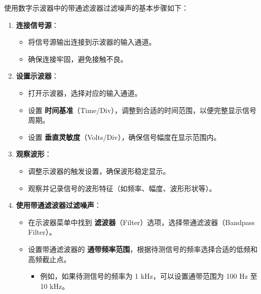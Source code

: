 \documentclass[dvipsnames, svgnames,a4paper,11pt]{article}
\begin{document}
	使用数字示波器中的带通滤波器过滤噪声的基本步骤如下：
	\begin{enumerate} 

		\item \textbf{连接信号源}：
			\begin{itemize}
				\item 将信号源输出连接到示波器的输入通道。
				\item 确保连接牢固，避免接触不良。
			\end{itemize}

		\item \textbf{设置示波器}：
			\begin{itemize}
				\item 打开示波器，选择对应的输入通道。
				\item 设置 \textbf{时间基准}（Time/Div），调整到合适的时间范围，以便完整显示信号周期。
				\item 设置 \textbf{垂直灵敏度}（Volts/Div），确保信号幅度在显示范围内。
			\end{itemize}

		\item \textbf{观察波形}：
			\begin{itemize}
				\item 调整示波器的触发设置，确保波形稳定显示。
				\item 观察并记录信号的波形特征（如频率、幅度、波形形状等）。
			\end{itemize}

		\item \textbf{使用带通滤波器过滤噪声}：
			\begin{itemize}
				\item 在示波器菜单中找到 \textbf{滤波器}（Filter）选项，选择带通滤波器（Bandpass Filter）。
				\item 设置带通滤波器的 \textbf{通带频率范围}，根据待测信号的频率选择合适的低频和高频截止点。
					\begin{itemize}
						\item 例如，如果待测信号的频率为 1 kHz，可以设置通带范围为 100 Hz 至 10 kHz。
					\end{itemize}
			\end{itemize}


\end{enumerate}
\end{document}
